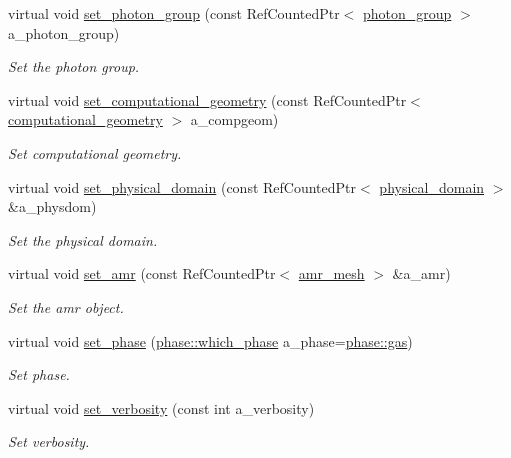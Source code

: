 \begin{DoxyCompactItemize}
virtual void \hyperlink{classrte__solver_a825df4451deefb078c827de9f717ed3e}{set\+\_\+photon\+\_\+group} (const Ref\+Counted\+Ptr$<$ \hyperlink{classphoton__group}{photon\+\_\+group} $>$ a\+\_\+photon\+\_\+group)
\begin{DoxyCompactList}\small\item\em Set the photon group. \end{DoxyCompactList}\item 
virtual void \hyperlink{classrte__solver_a473af1c14d01c15f0a3d68cccb0a12bd}{set\+\_\+computational\+\_\+geometry} (const Ref\+Counted\+Ptr$<$ \hyperlink{classcomputational__geometry}{computational\+\_\+geometry} $>$ a\+\_\+compgeom)
\begin{DoxyCompactList}\small\item\em Set computational geometry. \end{DoxyCompactList}\item 
virtual void \hyperlink{classrte__solver_af233bf45e20ae09f9cc517292cb0dd82}{set\+\_\+physical\+\_\+domain} (const Ref\+Counted\+Ptr$<$ \hyperlink{classphysical__domain}{physical\+\_\+domain} $>$ \&a\+\_\+physdom)
\begin{DoxyCompactList}\small\item\em Set the physical domain. \end{DoxyCompactList}\item 
virtual void \hyperlink{classrte__solver_a2472b5b649c82fdc1ad7085103596e39}{set\+\_\+amr} (const Ref\+Counted\+Ptr$<$ \hyperlink{classamr__mesh}{amr\+\_\+mesh} $>$ \&a\+\_\+amr)
\begin{DoxyCompactList}\small\item\em Set the amr object. \end{DoxyCompactList}\item 
virtual void \hyperlink{classrte__solver_ac29835abfb26e51c1cccd2daf9a2fac4}{set\+\_\+phase} (\hyperlink{namespacephase_a23c76f548a5eb1955ed8c929c541108b}{phase\+::which\+\_\+phase} a\+\_\+phase=\hyperlink{namespacephase_a23c76f548a5eb1955ed8c929c541108bad0a7c1eb8fd916c8b7ec85be0fd23b38}{phase\+::gas})
\begin{DoxyCompactList}\small\item\em Set phase. \end{DoxyCompactList}\item 
virtual void \hyperlink{classrte__solver_a33385e364a63497f27aba219891c21b6}{set\+\_\+verbosity} (const int a\+\_\+verbosity)
\begin{DoxyCompactList}\small\item\em Set verbosity. \end{DoxyCompactList}\item 

\end{DoxyCompactItemize}
